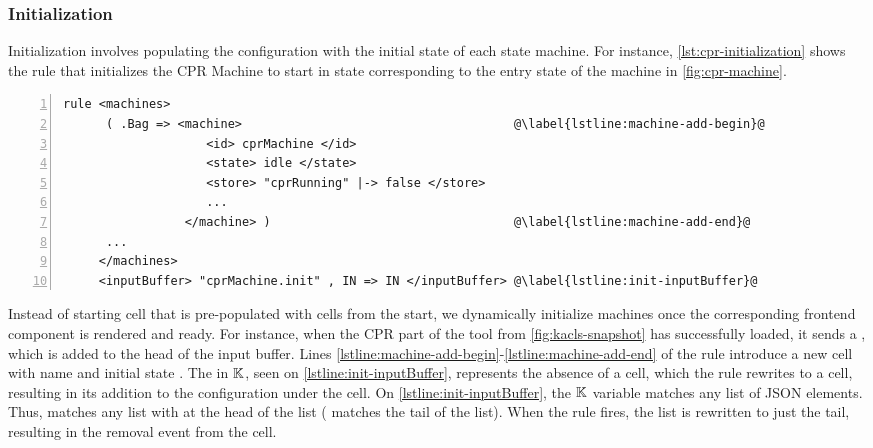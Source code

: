 \subsubsection{Initialization}

Initialization involves populating the configuration with the
initial state of each state machine. For instance,
\autoref{lst:cpr-initialization} shows the rule that initializes
the CPR Machine to start in state  corresponding to the
entry state of the machine in \autoref{fig:cpr-machine}.

\begin{lstlisting}[float=ht,
  frame=single,
  style=ksty,
  language=k,
  numbers=left,
  numbersep=5pt,
  caption={CPR Initialization},
  label={lst:cpr-initialization},
  xleftmargin=3ex
]
rule <machines>
      ( .Bag => <machine>                                      @\label{lstline:machine-add-begin}@
                    <id> cprMachine </id>
                    <state> idle </state>
                    <store> "cprRunning" |-> false </store>
                    ...
                 </machine> )                                  @\label{lstline:machine-add-end}@
      ...
     </machines>
     <inputBuffer> "cprMachine.init" , IN => IN </inputBuffer> @\label{lstline:init-inputBuffer}@
\end{lstlisting}
Instead of starting  cell that is pre-populated with
 cells from the start, we dynamically initialize
machines once the corresponding frontend component is rendered and ready.
For instance, when the CPR part of the tool from
\autoref{fig:kacls-snapshot} has successfully loaded, it sends a ,
which is added to the head of the input buffer.
Lines \ref{lstline:machine-add-begin}-\ref{lstline:machine-add-end} of the rule
introduce a new  cell with name  and initial
state . The  in $\mathbb{K}$, seen on
\autoref{lstline:init-inputBuffer}, represents the absence of a cell, which
the rule rewrites to a  cell, resulting in its
addition to the configuration under the  cell.
On \autoref{lstline:init-inputBuffer}, the $\mathbb{K}$ variable  matches any list of
JSON elements. Thus,  matches any list with
 at the head of the list ( matches the tail of
the list). When the rule fires, the list is rewritten to
just the tail, resulting in the removal 
event from the  cell.

